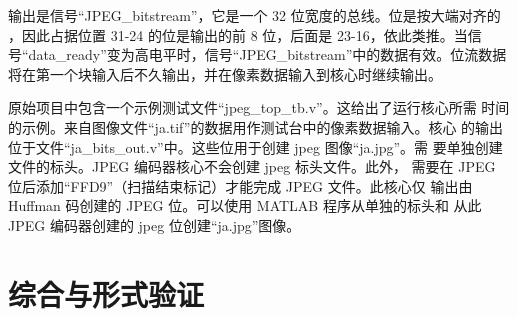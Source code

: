 \documentclass[12pt,hyperref,a4paper,UTF8]{ctexart}
\begin{document}
输出是信号“JPEG\_bitstream”，它是一个 32 位宽度的总线。位是按大端对齐的
，因此占据位置 31-24 的位是输出的前 8 位，后面是 23-16，依此类推。当信
号“data\_ready”变为高电平时，信号“JPEG\_bitstream”中的数据有效。位流数据
将在第一个块输入后不久输出，并在像素数据输入到核心时继续输出。

原始项目中包含一个示例测试文件“jpeg\_top\_tb.v”。这给出了运行核心所需
时间的示例。来自图像文件“ja.tif”的数据用作测试台中的像素数据输入。核心
的输出位于文件“ja\_bits\_out.v”中。这些位用于创建 jpeg 图像“ja.jpg”。需
要单独创建文件的标头。JPEG 编码器核心不会创建 jpeg 标头文件。此外，
需要在 JPEG 位后添加“FFD9”（扫描结束标记）才能完成 JPEG 文件。此核心仅
输出由 Huffman 码创建的 JPEG 位。可以使用 MATLAB 程序从单独的标头和
从此 JPEG 编码器创建的 jpeg 位创建“ja.jpg”图像。

\newpage

\section{综合与形式验证}
\end{document}
